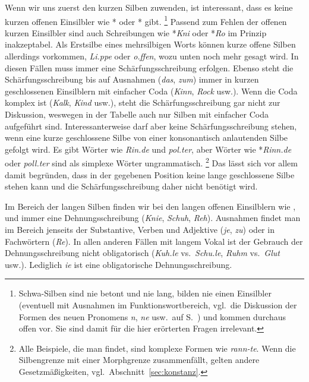 Wenn wir uns zuerst den kurzen Silben zuwenden, ist interessant, dass es keine kurzen offenen Einsilbler wie *\textipa{[knI]} oder *\textipa{[KO]} gibt.%
\footnote{Schwa-Silben sind nie betont und nie lang, bilden nie einen Einsilbler (eventuell mit Ausnahmen im Funktionswortbereich, vgl.\ die Diskussion der Formen des neuen Pronomens \textit{n}, \textit{ne} usw.\ auf S.~\pageref{abs:nen}) und kommen durchaus offen vor.
Sie sind damit für die hier erörterten Fragen irrelevant.}
Passend zum Fehlen der offenen kurzen Einsilbler sind auch Schreibungen wie *\textit{Kni} oder *\textit{Ro} im Prinzip inakzeptabel.
Als Erstsilbe eines mehrsilbigen Worts können kurze offene Silben allerdings vorkommen, \zB \textit{Li.ppe} oder \textit{o.ffen}, wozu unten noch mehr gesagt wird.
In diesen Fällen muss immer eine Schärfungsschreibung erfolgen.
Ebenso steht die Schärfungsschreibung bis auf Ausnahmen (\textit{das}, \textit{zum}) immer in kurzen geschlossenen Einsilblern mit einfacher Coda (\textit{Kinn}, \textit{Rock} usw.).
Wenn die Coda komplex ist (\textit{Kalk}, \textit{Kind} usw.), steht die Schärfungsschreibung gar nicht zur Diskussion, weswegen in der Tabelle auch nur Silben mit einfacher Coda aufgeführt sind.
Interessanterweise darf aber keine Schärfungsschreibung stehen, wenn eine kurze geschlossene Silbe von einer konsonantisch anlautenden Silbe gefolgt wird.
Es gibt Wörter wie \textit{Rin.de} und \textit{pol.ter}, aber Wörter wie *\textit{Rinn.de} oder \textit{poll.ter} sind als simplexe Wörter ungrammatisch.%
\footnote{Alle Beispiele, die man findet, sind komplexe Formen wie \textit{rann-te}.
Wenn die Silbengrenze mit einer Morphgrenze zusammenfällt, gelten andere Gesetzmäßigkeiten, vgl.\ Abschnitt~\ref{sec:konstanz}.}
Das lässt sich vor allem damit begründen, dass in der gegebenen Position keine lange geschlossene Silbe stehen kann und die Schärfungsschreibung daher nicht benötigt wird.

Im Bereich der langen Silben finden wir bei den langen offenen Einsilblern wie \textipa{[kni:]}, \textipa{[Su:]} und \textipa{[Ke:]} immer eine Dehnungsschreibung (\textit{Knie}, \textit{Schuh}, \textit{Reh}).
Ausnahmen findet man im Bereich jenseits der Substantive, Verben und Adjektive (\zB \textit{je}, \textit{zu}) oder in Fachwörtern (\zB \textit{Re}).
In allen anderen Fällen mit langem Vokal ist der Gebrauch der Dehnungsschreibung nicht obligatorisch (\textit{Kuh.le} vs.\ \textit{Schu.le}, \textit{Ruhm} vs.\ \textit{Glut} usw.).
Lediglich \textit{ie} ist eine obligatorische Dehnungsschreibung.

